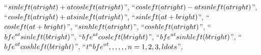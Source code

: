 \documentclass[
  letterpaper,
  DIV=11,
  numbers=noendperiod]{scrartcl}
\begin{document}
``\(\\sin \\left( {at} \\right) + at\\cos \\left( {at} \\right)\)'',
``\(\\cos \\left( {at} \\right) - at\\sin \\left( {at} \\right)\)'',
``\(\\cos \\left( {at} \\right) + at\\sin \\left( {at} \\right)\)'',
``\(\\sin \\left( {at + b} \\right)\)'',
``\(\\cos \\left( {at + b} \\right)\)'',
``\(\\sinh \\left( {at} \\right)\)'',
``\(\\cosh \\left( {at} \\right)\)'',
``\({{\\bf{e}}^{at}}\\sin \\left( {bt} \\right)\)'',
``\({{\\bf{e}}^{at}}\\cos \\left( {bt} \\right)\)'',
``\({{\\bf{e}}^{at}}\\sinh \\left( {bt} \\right)\)'',
``\({{\\bf{e}}^{at}}\\cosh \\left( {bt} \\right)\)'',
``\({t^n}{{\\bf{e}}^{at}},\\,\\,\\,\\,\\,n = 1,2,3, \\ldots\)'',
\end{document}
